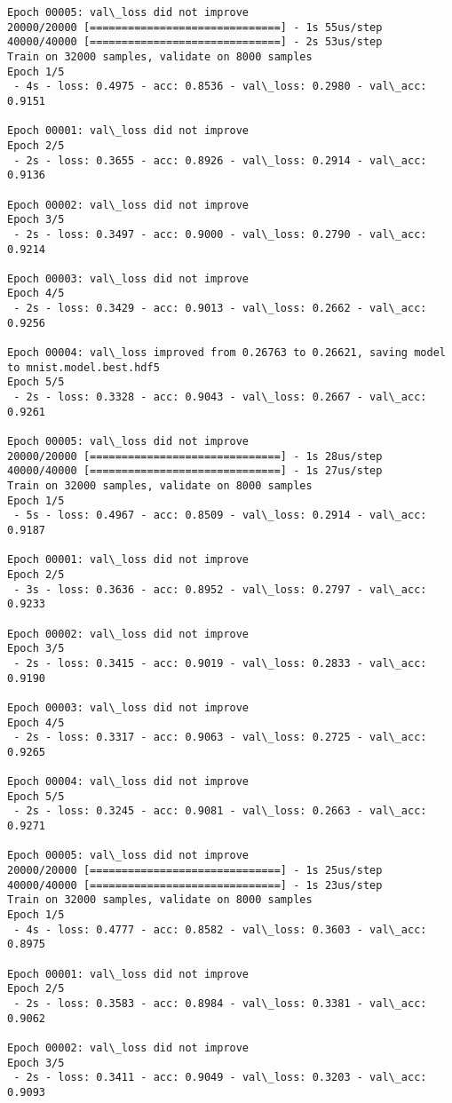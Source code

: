 \documentclass[11pt]{article}
\begin{document}
\begin{Verbatim}[commandchars=\\\{\}]
Epoch 00005: val\_loss did not improve
20000/20000 [==============================] - 1s 55us/step
40000/40000 [==============================] - 2s 53us/step
Train on 32000 samples, validate on 8000 samples
Epoch 1/5
 - 4s - loss: 0.4975 - acc: 0.8536 - val\_loss: 0.2980 - val\_acc: 0.9151

Epoch 00001: val\_loss did not improve
Epoch 2/5
 - 2s - loss: 0.3655 - acc: 0.8926 - val\_loss: 0.2914 - val\_acc: 0.9136

Epoch 00002: val\_loss did not improve
Epoch 3/5
 - 2s - loss: 0.3497 - acc: 0.9000 - val\_loss: 0.2790 - val\_acc: 0.9214

Epoch 00003: val\_loss did not improve
Epoch 4/5
 - 2s - loss: 0.3429 - acc: 0.9013 - val\_loss: 0.2662 - val\_acc: 0.9256

Epoch 00004: val\_loss improved from 0.26763 to 0.26621, saving model to mnist.model.best.hdf5
Epoch 5/5
 - 2s - loss: 0.3328 - acc: 0.9043 - val\_loss: 0.2667 - val\_acc: 0.9261

Epoch 00005: val\_loss did not improve
20000/20000 [==============================] - 1s 28us/step
40000/40000 [==============================] - 1s 27us/step
Train on 32000 samples, validate on 8000 samples
Epoch 1/5
 - 5s - loss: 0.4967 - acc: 0.8509 - val\_loss: 0.2914 - val\_acc: 0.9187

Epoch 00001: val\_loss did not improve
Epoch 2/5
 - 3s - loss: 0.3636 - acc: 0.8952 - val\_loss: 0.2797 - val\_acc: 0.9233

Epoch 00002: val\_loss did not improve
Epoch 3/5
 - 2s - loss: 0.3415 - acc: 0.9019 - val\_loss: 0.2833 - val\_acc: 0.9190

Epoch 00003: val\_loss did not improve
Epoch 4/5
 - 2s - loss: 0.3317 - acc: 0.9063 - val\_loss: 0.2725 - val\_acc: 0.9265

Epoch 00004: val\_loss did not improve
Epoch 5/5
 - 2s - loss: 0.3245 - acc: 0.9081 - val\_loss: 0.2663 - val\_acc: 0.9271

Epoch 00005: val\_loss did not improve
20000/20000 [==============================] - 1s 25us/step
40000/40000 [==============================] - 1s 23us/step
Train on 32000 samples, validate on 8000 samples
Epoch 1/5
 - 4s - loss: 0.4777 - acc: 0.8582 - val\_loss: 0.3603 - val\_acc: 0.8975

Epoch 00001: val\_loss did not improve
Epoch 2/5
 - 2s - loss: 0.3583 - acc: 0.8984 - val\_loss: 0.3381 - val\_acc: 0.9062

Epoch 00002: val\_loss did not improve
Epoch 3/5
 - 2s - loss: 0.3411 - acc: 0.9049 - val\_loss: 0.3203 - val\_acc: 0.9093


\end{Verbatim}
\end{document}
